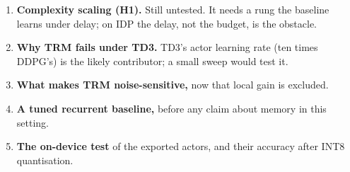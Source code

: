 \documentclass[11pt]{article}
\begin{document}
\begin{enumerate}
\item \textbf{Complexity scaling (H1).} Still untested. It needs a rung the baseline learns under delay; on IDP the delay, not the budget, is the obstacle.
\item \textbf{Why TRM fails under TD3.} TD3's actor learning rate (ten times DDPG's) is the likely contributor; a small sweep would test it.
\item \textbf{What makes TRM noise-sensitive,} now that local gain is excluded.
\item \textbf{A tuned recurrent baseline,} before any claim about memory in this setting.
\item \textbf{The on-device test} of the exported actors, and their accuracy after INT8 quantisation.
\end{enumerate}
\end{document}
